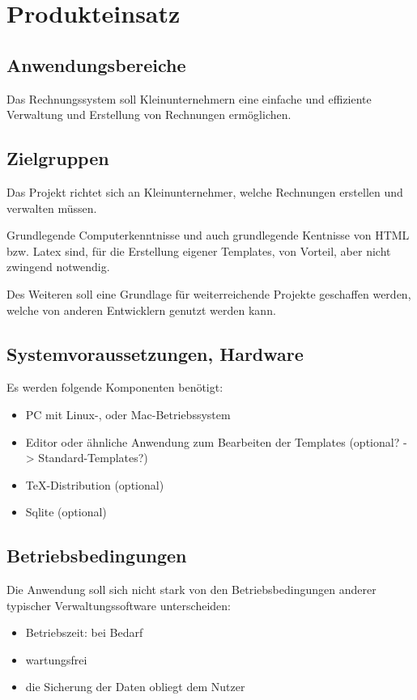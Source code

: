 
\section{Produkteinsatz}


\subsection{Anwendungsbereiche}

Das Rechnungssystem soll Kleinunternehmern eine einfache und effiziente Verwaltung und Erstellung von Rechnungen ermöglichen.

\subsection{Zielgruppen}

Das Projekt richtet sich an Kleinunternehmer, welche Rechnungen erstellen und verwalten müssen.

Grundlegende Computerkenntnisse und auch grundlegende Kentnisse von HTML bzw. Latex sind, für die Erstellung eigener Templates, von Vorteil, aber nicht zwingend notwendig.

Des Weiteren soll eine Grundlage für weiterreichende Projekte geschaffen werden, welche von anderen Entwicklern genutzt werden kann.

\subsection{Systemvoraussetzungen, Hardware}
Es werden folgende Komponenten benötigt:
\begin{itemize}
	\item PC mit Linux-, oder Mac-Betriebssystem
	\item Editor oder ähnliche Anwendung zum Bearbeiten der Templates (optional? -> Standard-Templates?)
	\item TeX-Distribution (optional)
	\item Sqlite (optional)
\end{itemize}

\subsection{Betriebsbedingungen}
Die Anwendung soll sich nicht stark von den Betriebsbedingungen anderer typischer Verwaltungssoftware unterscheiden:

\begin{itemize}
	\item Betriebszeit: bei Bedarf
	\item wartungsfrei
	\item die Sicherung der Daten obliegt dem Nutzer
\end{itemize}
